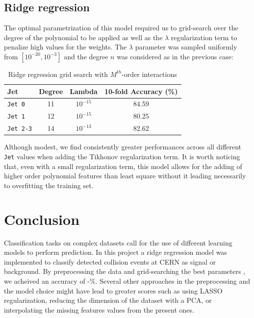 \documentclass[10pt,conference,compsocconf]{IEEEtran}
\begin{document}
\subsection{Ridge regression}
The optimal parametrization of this model required us to grid-search over the degree of the polynomial to be applied as well as the $\lambda$ regularization term to penalize high values for the weights. The $\lambda$ parameter was sampled uniformly from $[10^{-20},10^{-3}]$ and the degree $n$ was considered as in the previous case: 
\vspace{-0.5cm}
\begin{table}[h!]
\centering
\caption{Ridge regression grid search  with  $M^{th}$-order interactions}
\footnotesize
\begin{tabular}{|l| cc|c| } 
 \hline
   Jet & Degree & Lambda & 10-fold Accuracy (\%)  \\
 \hline
   \verb+Jet 0+  & 11 & $10^{-15}$  & 84.59  \\
   \verb+Jet 1+  & 12 & $10^{-15}$  & 80.25 \\
   \verb+Jet 2-3+  & 14  &  $10^{-13}$ & 82.62 \\
  \hline
  \end{tabular}
\label{grid_search_ridge_cross}
\end{table}

Although modest, we find consistently greater performances across all different \verb+Jet+ values when adding the Tikhonov regularization term. It is worth noticing that, even with a small regularization term, this model allows for the adding of higher order polynomial features than least square without it leading necessarily to overfitting the training set. 


\section{Conclusion}
Classification tasks on complex datasets call for the use of different learning models to perform prediction. In this project a ridge regression model was implemented to classify detected collision events at CERN as signal or background. By preprocessing the data and grid-searching the best parameters , we acheived an accuracy of -\%. Several other approaches in the preprocessing and the model choice might have lead to greater scores such as using LASSO regularization, reducing the dimension of the dataset with a PCA, or interpolating the missing features values from the present ones.
\end{document}
